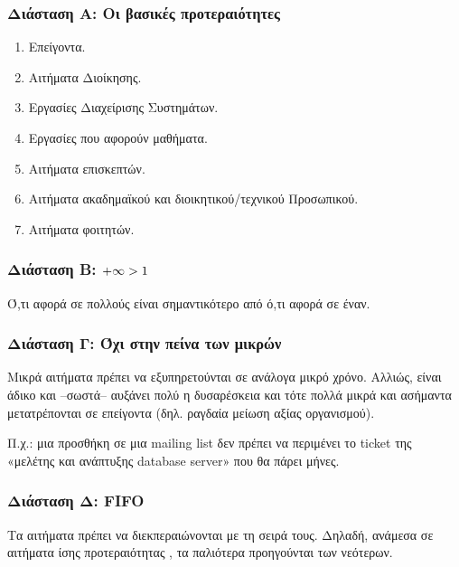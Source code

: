 \documentclass[letterpaper,10pt,greek]{sphinxhowto}
\begin{document}
\subsubsection{Διάσταση Α: Οι βασικές προτεραιότητες}
\label{\detokenize{PolicyTicket:id3}}\begin{enumerate}
%
\setcounter{enumi}{-1}
\item {} 
\sphinxAtStartPar
Επείγοντα.

\item {} 
\sphinxAtStartPar
Αιτήματα Διοίκησης.

\item {} 
\sphinxAtStartPar
Εργασίες Διαχείρισης Συστημάτων.

\item {} 
\sphinxAtStartPar
Εργασίες που αφορούν μαθήματα.

\item {} 
\sphinxAtStartPar
Αιτήματα επισκεπτών.

\item {} 
\sphinxAtStartPar
Αιτήματα ακαδημαϊκού και διοικητικού/τεχνικού Προσωπικού.

\item {} 
\sphinxAtStartPar
Αιτήματα φοιτητών.

\end{enumerate}


\subsubsection{Διάσταση Β: \protect\(+\infty > 1\protect\)}
\label{\detokenize{PolicyTicket:infty-1}}
\sphinxAtStartPar
Ό,τι αφορά σε πολλούς είναι σημαντικότερο από ό,τι αφορά σε έναν.


\subsubsection{Διάσταση Γ: Όχι στην πείνα των μικρών}
\label{\detokenize{PolicyTicket:id4}}
\sphinxAtStartPar
Μικρά αιτήματα πρέπει να εξυπηρετούνται σε ανάλογα μικρό χρόνο.
Αλλιώς, είναι άδικο και –σωστά– αυξάνει πολύ η δυσαρέσκεια
και τότε πολλά μικρά και ασήμαντα μετατρέπονται σε επείγοντα
(δηλ. ραγδαία μείωση αξίας οργανισμού).

\sphinxAtStartPar
Π.χ.: μια προσθήκη σε μια mailing list δεν πρέπει να περιμένει
το ticket της «μελέτης και ανάπτυξης database server»
που θα πάρει μήνες.


\subsubsection{Διάσταση Δ: FIFO}
\label{\detokenize{PolicyTicket:fifo}}
\sphinxAtStartPar
Τα αιτήματα πρέπει να διεκπεραιώνονται με τη σειρά τους.
Δηλαδή, ανάμεσα σε αιτήματα ίσης προτεραιότητας , τα παλιότερα προηγούνται των νεότερων.
\end{document}

